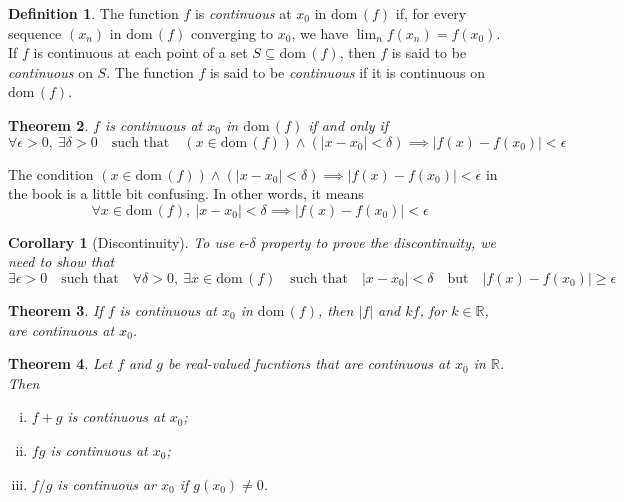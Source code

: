 \documentclass[12pt, lettersize]{book}
\theoremstyle{plain}
\newtheorem{thm}{Theorem}[section]
\newtheorem{cor}{Corollary}[thm]
\theoremstyle{definition}
\newtheorem{dfn}[thm]{Definition}
\theoremstyle{remark}
\newcommand{\R}{\mathbb{R}}
\newcommand{\dom}{\text{dom}\,}
\begin{document}
		\begin{dfn}\label{def:continuous}
			The function $f$ is \emph{continuous} at $x_0$ in $\dom(f)$ if, for every sequence $(x_n)$ in $\dom(f)$ converging to $x_0$, we have $\lim_nf(x_n)=f(x_0)$. If $f$ is continuous at each point of a set $S\subseteq\dom(f)$, then $f$ is said to be \emph{continuous} on $S$. The function $f$ is said to be
			\emph{continuous} if it is continuous on $\dom(f)$.
		\end{dfn}
		
		\setcounter{equation}{0}
		\begin{thm}\label{def:delta-epsilon property}
			$f$ is continuous at $x_0$ in $\dom(f)$ if and only if
			\begin{equation}
				\forall\epsilon>0,\ \exists\delta>0\quad\text{such 	that}\quad(x\in\dom(f))\land(|x-x_0|<\delta)\implies|f(x)-f(x_0)|<\epsilon
			\end{equation}
		\end{thm}
		The condition $(x\in\dom(f))\land(|x-x_0|<\delta)\implies|f(x)-f(x_0)|<\epsilon$ in the book is a little bit
		confusing. In other words, it means
		\begin{displaymath}
			\forall x\in\dom(f),\ |x-x_0|<\delta\implies|f(x)-f(x_0)|<\epsilon
		\end{displaymath}
		
		\begin{cor}[Discontinuity]
			To use $\epsilon\text{-}\delta$ property to prove the discontinuity, we need to show that
			\begin{displaymath}
				\exists\epsilon>0\quad\text{such that}\quad\forall\delta>0,\ \exists x\in\dom(f)\quad\text{such that}\quad |x-x_0|<\delta\quad\text{but}\quad|f(x)-f(x_0)|\geq\epsilon
			\end{displaymath}
		\end{cor}
		
		\begin{thm}\label{def:17.3}
			If $f$ is continuous at $x_0$ in $\dom(f)$, then $|f|$ and $kf$, for $k\in\R$, are continuous at $x_0$.
		\end{thm}
		
		\begin{thm}\label{def:17.4}
			Let $f$ and $g$ be real-valued fucntions that are continuous at $x_0$ in $\R$. Then
			\begin{enumerate}[(i)]
				\item $f+g$ is continuous at $x_0$;
				\item $fg$ is continuous at $x_0$;
				\item $f/g$ is continuous ar $x_0$ if $g(x_0)\neq0$.
			\end{enumerate}
		\end{thm}
		
\end{document}

